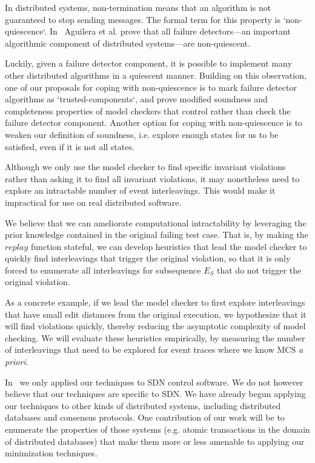 In distributed systems, non-termination means that an algorithm is not guaranteed to stop
sending messages. The formal term for this property is `non-quiescence`. In~\cite{aguilera1997heartbeat} Aguilera et al. prove that
all failure detectors---an important algorithmic component of distributed systems---are
non-quiescent.

Luckily, given a failure detector component, it is possible to implement many other
distributed algorithms in a quiescent manner. Building on this observation,
one of our proposals for coping with non-quiescence is to mark failure detector algorithms as `trusted-components`,
and prove modified soundness and completeness properties of model checkers that control rather than check the failure detector component.
Another option for coping with non-quiescence is to weaken our definition of soundness,
i.e. explore enough states for us to be satisfied, even if it is not all states.

 Although we only use the
model checker to find specific invariant violations rather than asking it to
find all invariant violations, it may nonetheless need to explore an
intractable number of event interleavings. This would make it impractical for
use on real distributed software.

We believe that we can ameliorate computational intractability by
leveraging the prior knowledge contained in the original failing test case.
That is, by making the $replay$ function stateful, we can develop heuristics that lead the
model checker to quickly find interleavings that trigger the original violation, so that
it is only forced to enumerate all interleavings for subsequence $E_S$ that do
not trigger the original violation.

As a concrete example, if we lead
the model checker to first explore interleavings that have small edit
distances from the original execution, we hypothesize that it will find
violations quickly, thereby reducing the asymptotic complexity of model
checking. We will evaluate these heuristics empirically, by measuring the number of
interleavings that need to be explored for event traces where we know
MCS {\em a priori}.

 In~\cite{sts2014} we
only applied our techniques to SDN control software. We do not however believe
that our techniques are specific to SDN. We have already begun applying our
techniques to other kinds of distributed systems, including distributed
databases and consensus protocols. One contribution of our work will be to
enumerate the properties of those systems (e.g. atomic transactions in the
domain of distributed databases) that make them more or less amenable to
applying our minimization techniques.

